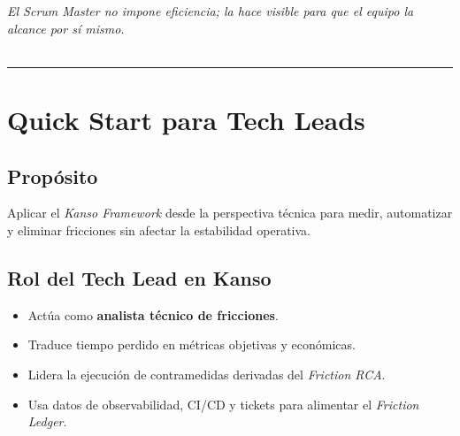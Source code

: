\textit{El Scrum Master no impone eficiencia; la hace visible para que el equipo la alcance por sí mismo.}
\\
\\
\hrule

\section{Quick Start para Tech Leads}

\subsection*{Propósito}
Aplicar el \textit{Kanso Framework} desde la perspectiva técnica para medir, automatizar y eliminar fricciones sin afectar la estabilidad operativa.

\subsection*{Rol del Tech Lead en Kanso}
\begin{itemize}
    \item Actúa como \textbf{analista técnico de fricciones}.
    \item Traduce tiempo perdido en métricas objetivas y económicas.
    \item Lidera la ejecución de contramedidas derivadas del \textit{Friction RCA}.
    \item Usa datos de observabilidad, CI/CD y tickets para alimentar el \textit{Friction Ledger}.
\end{itemize}

